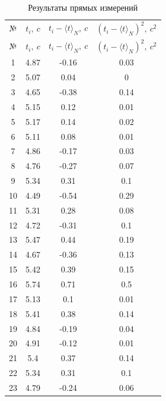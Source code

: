 \documentclass[12pt]{article}
\begin{document}
\begin{longtable}{|c|c|c|c|}
    \captionsetup{justification=centering, font=bf}
    \caption{Результаты прямых измерений} \\
    \hline
    № & $t_i, \ c$ & $t_i - \langle t \rangle_N, \ c$ & $(t_i - \langle t \rangle_N)^2, \ c^2$ \\
    \hline
    \endfirsthead
    
    \hline
    № & $t_i, \ c$ & $t_i - \langle t \rangle_N, \ c$ & $(t_i - \langle t \rangle_N)^2, \ c^2$ \\
    \hline
    \endhead

    \hline
    \endfoot
    
    \hline
    \endlastfoot
    
    1	&	4.87	&	-0.16	&	0.03	\\
    \hline
    2	&	5.07	&	0.04	&	0	\\
    \hline
    3	&	4.65	&	-0.38	&	0.14	\\
    \hline
    4	&	5.15	&	0.12	&	0.01	\\
    \hline
    5	&	5.17	&	0.14	&	0.02	\\
    \hline
    6	&	5.11	&	0.08	&	0.01	\\
    \hline
    7	&	4.86	&	-0.17	&	0.03	\\
    \hline
    8	&	4.76	&	-0.27	&	0.07	\\
    \hline
    9	&	5.34	&	0.31	&	0.1	\\
    \hline
    10	&	4.49	&	-0.54	&	0.29	\\
    \hline
    11	&	5.31	&	0.28	&	0.08	\\
    \hline
    12	&	4.72	&	-0.31	&	0.1	\\
    \hline
    13	&	5.47	&	0.44	&	0.19	\\
    \hline
    14	&	4.67	&	-0.36	&	0.13	\\
    \hline
    15	&	5.42	&	0.39	&	0.15	\\
    \hline
    16	&	5.74	&	0.71	&	0.5	\\
    \hline
    17	&	5.13	&	0.1	&	0.01	\\
    \hline
    18	&	5.41	&	0.38	&	0.14	\\
    \hline
    19	&	4.84	&	-0.19	&	0.04	\\
    \hline
    20	&	4.91	&	-0.12	&	0.01	\\
    \hline
    21	&	5.4	&	0.37	&	0.14	\\
    \hline
    22	&	5.34	&	0.31	&	0.1	\\
    \hline
    23	&	4.79	&	-0.24	&	0.06	\\

\end{longtable}
\end{document}
